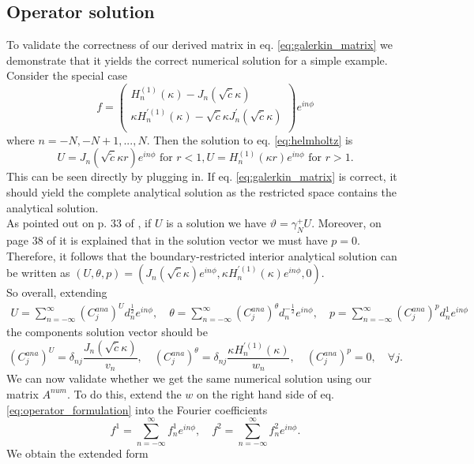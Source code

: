 \documentclass[12pt,journal,compsoc, onecolumn]{IEEEtran}
\begin{document}
\subsection{Operator solution}
To validate the correctness of our derived matrix in eq. \ref{eq:galerkin_matrix} we demonstrate that it yields the correct numerical solution for a simple example. 
Consider the special case
$$
{f} = 
\begin{pmatrix}
    H_n^{(1)}(\kappa) -  J_n(\sqrt{\tilde c} \kappa ) \\
    \kappa H_n^{\prime (1)}(\kappa) - \sqrt{\tilde c} \kappa J_n^{\prime}(\sqrt{\tilde c} \kappa )\\
\end{pmatrix} e^{i n \phi}
$$
where $n =-N, -N+1, ..., N$. 
Then the solution to eq. \ref{eq:helmholtz} is 
$$
U = J_n(\sqrt{\tilde c} \kappa r) e^{i n \phi} \text{ for }r < 1, U = H_n^{(1)}(\kappa r)e^{i n \phi} \text{ for } r > 1.
$$
This can be seen directly by plugging in.
If eq. \ref{eq:galerkin_matrix} is correct, it should yield the complete analytical solution as the restricted space contains the analytical solution. \\
As pointed out on p. 33 of \cite{meury2007stable}, if \(U\) is a solution we have \(\vartheta=\gamma_{N}^{+} U\). Moreover, on page 38 of \cite{meury2007stable} it is explained that in the solution vector we must have $p =0$. Therefore, it follows that the boundary-restricted interior analytical solution can be written as 
$(U, \theta, p) =
 \left({J_n(\sqrt{\tilde c}\kappa)e^{in\phi}} , {\kappa H_n^{\prime(1)}(\kappa)} e^{in\phi}, 0\right)$. \\
So overall, extending 
\begin{align*}
U = \sum\limits_{n = -\infty}^\infty (C_j^{ana})^U d_n^{\frac{1}{2}} e^{in\phi}, \quad
\theta = \sum\limits_{n = -\infty}^\infty (C_j^{ana})^\theta d_n^{-\frac{1}{2}} e^{in\phi}, \quad
p = \sum\limits_{n = -\infty}^\infty (C_j^{ana})^p d_n^{1} e^{in\phi}
\end{align*}the components solution vector should be
$$
    (C_j^{ana})^U = \delta_{nj}  \frac{J_n(\sqrt{\tilde c}\kappa)}{v_n}, \quad
    (C_j^{ana})^\theta = \delta_{nj} \frac{\kappa H_n^{\prime(1)}(\kappa)}{w_n}, \quad 
    (C_j^{ana})^p = 0, \quad
    \forall j.
$$
We can now validate whether we get the same numerical solution using our matrix ${A}^{num}$. To do this, extend the $w$ on the right hand side of eq. \ref{eq:operator_formulation}  into the Fourier coefficients  
$$f^1 = \sum\limits_{n = -\infty}^\infty f^1_n e^{in\phi}, \quad  f^2=\sum\limits_{n = -\infty}^\infty f^2_n  e^{in\phi}.$$ We obtain the extended form
\end{document}

